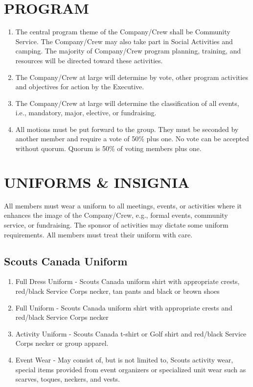 \documentclass{Service_Corps_Document}
\begin{document}
    \section{PROGRAM}\label{sec:program}
    \begin{enumerate}
        \item The central program theme of the Company/Crew shall be Community Service.
        The Company/Crew may also take part in Social Activities and camping.
        The majority of Company/Crew program planning, training, and resources will be directed toward these activities.
        \item The Company/Crew at large will determine by vote, other program activities and objectives for action by the Executive.
        \item The Company/Crew at large will determine the classification of all events, i.e., mandatory, major, elective, or fundraising.
        \item All motions must be put forward to the group.
        They must be seconded by another member and require a vote of 50\% plus one.
        No vote can be accepted without quorum.
        Quorum is 50\% of voting members plus one.
    \end{enumerate}


    \section{UNIFORMS \& INSIGNIA}\label{sec:uniforms-&-insignia}
    All members must wear a uniform to all meetings, events, or activities where it enhances the image of the Company/Crew, e.g., formal events, community service, or fundraising.
    The sponsor of activities may dictate some uniform requirements.
    All members must treat their uniform with care.

    \subsection{Scouts Canada Uniform}\label{subsec:scouts-canada-uniform}
    \begin{enumerate}
        \item Full Dress Uniform - Scouts Canada uniform shirt with appropriate crests, red/black Service Corps necker, tan pants and black or brown shoes
        \item Full Uniform - Scouts Canada uniform shirt with appropriate crests and red/black Service Corps necker
        \item Activity Uniform - Scouts Canada t-shirt or Golf shirt and red/black Service Corps necker or group apparel.
        \item Event Wear - May consist of, but is not limited to, Scouts activity wear, special items provided from event organizers or specialized unit wear such as scarves, toques, neckers, and vests.
    \end{enumerate}
\end{document}
